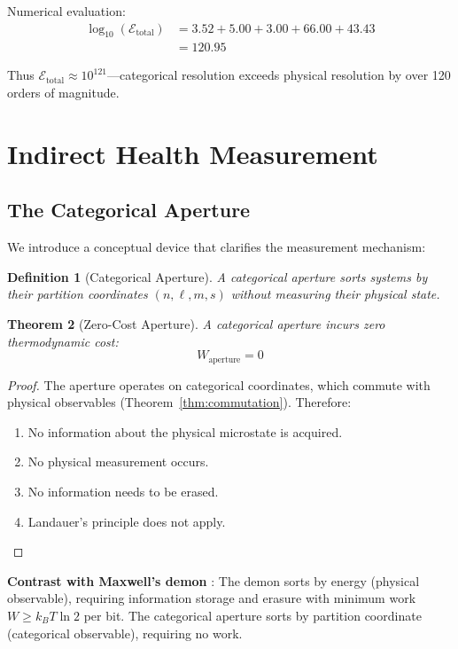 \documentclass[twocolumn,10pt]{article}
\newtheorem{theorem}{Theorem}[section]
\newtheorem{definition}[theorem]{Definition}
\begin{document}
Numerical evaluation:
\begin{align}
    \log_{10}(\mathcal{E}_{\text{total}}) &= 3.52 + 5.00 + 3.00 + 66.00 + 43.43 \\
    &= 120.95
\end{align}

Thus $\mathcal{E}_{\text{total}} \approx 10^{121}$---categorical resolution exceeds physical resolution by over 120 orders of magnitude.

\section{Indirect Health Measurement}

\subsection{The Categorical Aperture}

We introduce a conceptual device that clarifies the measurement mechanism:

\begin{definition}[Categorical Aperture]
A categorical aperture sorts systems by their partition coordinates $(n, \ell, m, s)$ without measuring their physical state.
\end{definition}

\begin{theorem}[Zero-Cost Aperture]
\label{thm:aperture}
A categorical aperture incurs zero thermodynamic cost:
\begin{equation}
    W_{\text{aperture}} = 0
\end{equation}
\end{theorem}

\begin{proof}
The aperture operates on categorical coordinates, which commute with physical observables (Theorem~\ref{thm:commutation}). Therefore:
\begin{enumerate}
    \item No information about the physical microstate is acquired.
    \item No physical measurement occurs.
    \item No information needs to be erased.
    \item Landauer's principle \cite{landauer1961} does not apply.
\end{enumerate}
\end{proof}

\textbf{Contrast with Maxwell's demon} \cite{maxwell1871,bennett1982}: The demon sorts by energy (physical observable), requiring information storage and erasure with minimum work $W \geq k_B T \ln 2$ per bit. The categorical aperture sorts by partition coordinate (categorical observable), requiring no work.
\end{document}

